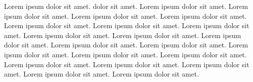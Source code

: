 \documentclass{article}
\begin{document}
    Lorem ipsum dolor sit amet.  dolor sit amet. Lorem ipsum dolor sit amet. 
    Lorem ipsum dolor sit amet.  Lorem ipsum dolor sit amet. Lorem ipsum dolor sit amet. 
    Lorem ipsum dolor sit amet. Lorem ipsum dolor sit amet. Lorem ipsum dolor sit amet. Lorem  ipsum dolor sit amet. 
    Lorem ipsum dolor sit amet. Lorem ipsum dolor sit amet. Lorem ipsum dolor sit amet.  Lorem  ipsum dolor sit amet. 
    Lorem ipsum dolor sit amet. Lorem ipsum dolor sit amet. Lorem ipsum dolor sit amet.  Lorem  ipsum dolor sit amet.
    Lorem ipsum dolor sit amet. Lorem ipsum dolor sit amet. Lorem ipsum dolor sit amet.  Lorem  ipsum dolor sit amet. 
\end{document}
